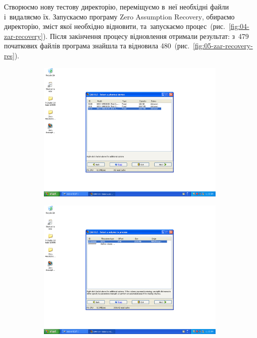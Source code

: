 \documentclass[
	a4paper,
	oneside,
	DIV = 12,
	fontsize = 13pt,
	headings = normal,
]{scrartcl}
\begin{document}
		Створюємо нову тестову директорію, переміщуємо в~неї необхідні файли і~видаляємо їх. Запускаємо програму \textenglish{Zero Assumption Recovery}, обираємо директорію, зміст якої необхідно відновити, та~запускаємо процес~(рис.~\ref{fig:04-zar-recovery}). Після закінчення процесу відновлення отримали результат: з~479 початкових файлів програма знайшла та відновила 480~(рис.~\ref{fig:05-zar-recovery-res}).

		\begin{figure}[!htbp]
			\centering
			\begin{subfigure}{0.5\columnwidth}
				\centering
				\includegraphics[height = 9\baselineskip]{./assets/y03s01-pcdiag-lab-03-p11.png}
				\caption{}
				\label{subfig:04-01-zar}
			\end{subfigure}%
			\begin{subfigure}{0.5\columnwidth}
				\centering
				\includegraphics[height = 9\baselineskip]{./assets/y03s01-pcdiag-lab-03-p12.png}

\end{subfigure}
\end{figure}
\end{document}
